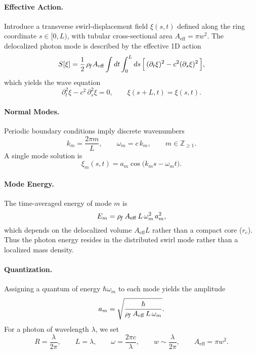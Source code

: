 \documentclass[11pt]{article}
\begin{document}
    \paragraph{Effective Action.}
    Introduce a transverse swirl-displacement field $\xi(s,t)$ defined along the ring coordinate $s \in [0,L)$, with tubular cross-sectional area $A_{\mathrm{eff}} = \pi w^2$. The delocalized photon mode is described by the effective 1D action
    \begin{equation*}
    S[\xi]
    = \frac{1}{2}\,\rho_{\!f} A_{\mathrm{eff}} \int dt \int_0^L ds \,
    \Big[ \, (\partial_t \xi)^2 - c^2 (\partial_s \xi)^2 \, \Big],
    \end{equation*}
    which yields the wave equation
    \begin{equation*}
    \partial_t^2 \xi - c^2 \,\partial_s^2 \xi = 0,
    \qquad \xi(s+L,t) = \xi(s,t).
    \end{equation*}

    \paragraph{Normal Modes.}
    Periodic boundary conditions imply discrete wavenumbers
    \begin{equation*}
    k_m = \frac{2\pi m}{L},
    \qquad \omega_m = c\,k_m,
    \qquad m \in \mathbb{Z}_{\ge 1}.
    \end{equation*}
    A single mode solution is
    \begin{equation*}
    \xi_m(s,t) = a_m \cos\!\big(k_m s - \omega_m t\big).
    \end{equation*}

    \paragraph{Mode Energy.}
    The time-averaged energy of mode $m$ is
    \begin{equation*}
    E_m = \rho_{\!f} \, A_{\mathrm{eff}} \, L \, \omega_m^2 \, a_m^2,
    \end{equation*}
    which depends on the delocalized volume $A_{\mathrm{eff}}L$ rather than a compact core ($r_c$). Thus the photon energy resides in the distributed swirl mode rather than a localized mass density.

    \paragraph{Quantization.}
    Assigning a quantum of energy $\hbar \omega_m$ to each mode yields the amplitude
    \begin{equation*}
        a_m = \sqrt{\frac{\hbar}{\rho_{\!f} \, A_{\mathrm{eff}} \, L \, \omega_m}}.
    \end{equation*}
    For a photon of wavelength $\lambda$, we set
    \begin{equation*}
        R = \frac{\lambda}{2\pi}, \qquad
        L = \lambda, \qquad
        \omega = \frac{2\pi c}{\lambda}, \qquad
        w \sim \frac{\lambda}{2\pi}, \qquad
        A_{\mathrm{eff}} = \pi w^2.
    \end{equation*}
\end{document}
